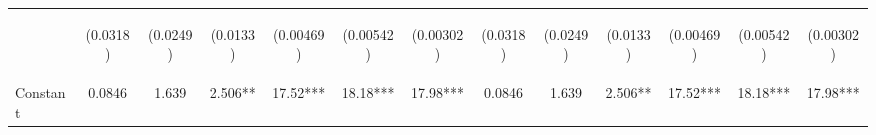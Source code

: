 \documentclass[]{article}
\begin{document}
\begin{center}
\begin{tabular}{lcccccccccccc}
\vspace{4pt} & \begin{footnotesize}(0.0318)\end{footnotesize} & \begin{footnotesize}(0.0249)\end{footnotesize} & \begin{footnotesize}(0.0133)\end{footnotesize} & \begin{footnotesize}(0.00469)\end{footnotesize} & \begin{footnotesize}(0.00542)\end{footnotesize} & \begin{footnotesize}(0.00302)\end{footnotesize} & \begin{footnotesize}(0.0318)\end{footnotesize} & \begin{footnotesize}(0.0249)\end{footnotesize} & \begin{footnotesize}(0.0133)\end{footnotesize} & \begin{footnotesize}(0.00469)\end{footnotesize} & \begin{footnotesize}(0.00542)\end{footnotesize} & \begin{footnotesize}(0.00302)\end{footnotesize} \\
Constant & 0.0846 & 1.639 & 2.506** & 17.52*** & 18.18*** & 17.98*** & 0.0846 & 1.639 & 2.506** & 17.52*** & 18.18*** & 17.98*** \\

\end{tabular}
\end{center}
\end{document}
